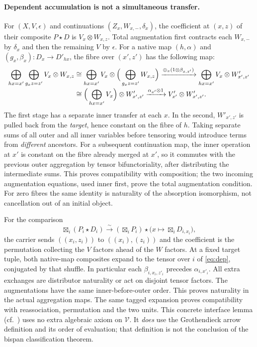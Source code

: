 \documentclass[11pt]{article}
\theoremstyle{definition}
\newcommand{\V}{\mathcal V}
\newcommand{\bx}{\mathop{\boxtimes}}
\newcommand{\St}{\mathbin{\star}}
\newcommand{\iso}{\xrightarrow{\sim}}
\begin{document}
\paragraph{Dependent accumulation is not a simultaneous transfer.}
For $(X,V,\epsilon)$ and continuations $(Z_x,W_{x,-},\delta_x)$,
the coefficient at $(x,z)$ of their composite $P\St D$ is
$V_x\otimes W_{x,z}$. Total augmentation first contracts each $W_{x,-}$
by $\delta_x$ and then the remaining $V$ by $\epsilon$.
For a native map $(h,\alpha)$ and $(g_x,\beta_x):D_x\to D'_{hx}$,
the fibre over $(x',z')$ has the following map:
\begin{align}
 \bigoplus_{hx=x'}\bigoplus_{g_x z=z'} V_x\otimes W_{x,z}
 &\cong\bigoplus_{hx=x'} V_x\otimes
             \Big(\bigoplus_{g_xz=z'} W_{x,z}\Big)
 \xrightarrow{\oplus_x(1\otimes\beta_{x,z'})}
       \bigoplus_{hx=x'}V_x\otimes W'_{x',z'}
 \notag\\[-2pt]
 &\cong\Big(\bigoplus_{hx=x'}V_x\Big)\otimes W'_{x',z'}
 \xrightarrow{\alpha_{x'}\otimes1}V'_{x'}\otimes W'_{x',z'} .
 \label{eq:dep}
\end{align}
The first stage has a separate inner transfer at each $x$. In the second,
$W'_{x',z'}$ is pulled back from the \emph{target}, hence constant on the
fibre of $h$. Taking separate sums of all outer and all inner variables
before tensoring would introduce terms from \emph{different} ancestors.
For a subsequent continuation map, the inner operation at $x'$ is
constant on the fibre already merged at $x'$, so it commutes with the
previous outer aggregation by tensor bifunctoriality, after distributing
the intermediate sums. This proves compatibility with composition; the
two incoming augmentation equations, used inner first, prove the total
augmentation condition. For zero fibres the same identity is naturality
of the absorption isomorphism, not cancellation out of an initial object.

For the comparison
\begin{equation}
 \bx_i(P_i\St D_i)\iso (\bx_i P_i)\St
               \bigl(x\longmapsto\bx_i D_{i,x_i}\bigr) ,
 \label{eq:Fubini}
\end{equation}
the carrier sends $((x_i,z_i))$ to $((x_i),(z_i))$ and the coefficient
is the permutation collecting the $V$ factors ahead of the $W$ factors.
At a fixed target tuple, both native-map composites expand to the tensor
over $i$ of \eqref{eq:dep}, conjugated by that shuffle. In particular
each $\beta_{i,x_i,z'_i}$ precedes $\alpha_{i,x'_i}$. All extra exchanges
are distributor naturality or act on disjoint tensor factors. The
augmentations have the same inner-before-outer order. This proves
naturality in the actual aggregation maps. The same tagged expansion proves
compatibility with reassociation, permutation and the two units.
This concrete interface lemma (cf.\ \cite[full native dependent
Fubini]{O1}) uses no extra algebraic axiom on $\V$. It \emph{does}
use the Grothendieck arrow definition and its order of evaluation; that
definition is not the conclusion of the bispan classification theorem.
\end{document}
